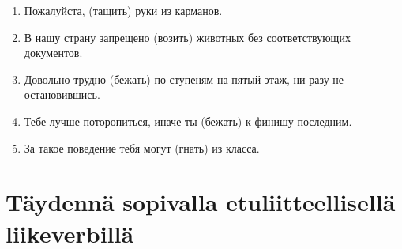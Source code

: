 \documentclass[paper=a4, fontsize=11pt]{scrartcl}
\begin{document}
\begin{enumerate}
    \item Пожалуйста, \raisebox{-0.1cm}{\shortstack{\underline{\hspace{3cm}}}}(тащить) руки из карманов.
    \item В нашу страну запрещено  \raisebox{-0.1cm}{\shortstack{\underline{\hspace{3cm}}}}(возить) животных без соответствующих документов.
    \item Довольно трудно \raisebox{-0.1cm}{\shortstack{\underline{\hspace{3cm}}}}(бежать) по ступеням на пятый этаж, ни разу не остановившись.
    \item Тебе лучше поторопиться, иначе ты \raisebox{-0.1cm}{\shortstack{\underline{\hspace{3cm}}}}(бежать) к финишу последним.
    \item За такое поведение тебя могут  \raisebox{-0.1cm}{\shortstack{\underline{\hspace{3cm}}}}(гнать) из класса.
\end{enumerate}

\section{Täydennä sopivalla etuliitteellisellä liikeverbillä}
\end{document}
